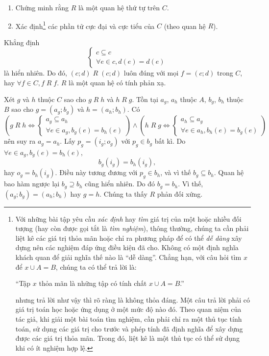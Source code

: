 \begin{enumerate}
   \item Chứng minh rằng $R$ là một quan hệ thứ tự trên $C$.
   \item Xác định\footnote{Với những bài tập yêu cầu \emph{xác định} hay \emph{tìm} giá trị của một hoặc nhiều đối tượng (hay còn được gọi tắt là \emph{tìm nghiệm}), thông thường, chúng ta cần phải liệt kê các giá trị thỏa mãn hoặc chỉ ra phương pháp để có thể \emph{dễ dàng} xây dựng nên các nghiệm đáp ứng điều kiện đã cho. Không có một định nghĩa khách quan để giải nghĩa thế nào là ``dễ dàng''. Chẳng hạn, với câu hỏi tìm $x$ để $x \cup A = B$, chúng ta có thể trả lời là:
\begin{center}
   ``Tập $x$ thỏa mãn là những tập có tính chất $x \cup A = B$.''
\end{center} nhưng trả lời như vậy thì rõ ràng là không thỏa đáng. Một câu trả lời phải có giá trị toán học hoặc ứng dụng ở một mức độ nào đó. Theo quan niệm của tác giả, khi giải một bài toán tìm nghiệm, cần phải chỉ ra một thủ tục tính toán, sử dụng các giá trị cho trước và phép tính đã định nghĩa để xây dựng được các giá trị thỏa mãn. Trong đó, liệt kê là một thủ tục có thể sử dụng khi có ít nghiệm hợp lệ.} các phần tử cực đại và cực tiểu của $C$ (theo quan hệ $R$).
\end{enumerate}

\solution

\resetSubexercise Khẳng định 
\begin{equation*}
   \begin{cases}
      c \subseteq c \\
      \forall e \in c, d(e) = d(e)
   \end{cases}
\end{equation*}
là hiển nhiên. Do đó, $(c; d)\; R \; (c; d)$ luôn đúng với mọi $f = (c; d)$ trong $C$, hay $\forall f \in C, f\;R\;f$. $R$ là một quan hệ có tính phản xạ.

Xét $g$ và $h$ thuộc $C$ sao cho $g\;R\;h$ và $h\;R\;g$. Tồn tại $a_g$, $a_h$ thuộc $A$, $b_g$, $b_h$ thuộc $B$ sao cho $g = (a_g; b_g)$ và $h = (a_h; b_h)$. Có
$$\left(g\;R\;h \iff \begin{cases}
   a_g \subseteq a_h \\
   \forall e \in a_g, b_g(e) = b_h(e)
\end{cases}\right) \land 
\left(h\;R\;g \iff \begin{cases}
   a_h \subseteq a_g \\
   \forall e \in a_h, b_h(e) = b_g(e)
\end{cases} \right)$$
nên suy ra $a_g = a_h$. Lấy $p_g = (i_g; o_g)$ với $p_g \in b_g$ bất kì. Do $\forall e \in a_g, b_g(e) = b_h(e)$, \begin{equation*}
   b_g(i_g) = b_h(i_g),
\end{equation*} hay $o_g = b_h(i_g)$. Điều này tương đương với $p_g \in b_h$, và vì thế $b_g \subseteq b_h$. Quan hệ bao hàm ngược lại $b_g \supseteq b_h$ cũng hiển nhiên. Do đó $b_g = b_h$. Vì thế, $(a_g; b_g) = (a_h; b_h)$ hay $g = h$. Chúng ta thấy $R$ phản đối xứng.

